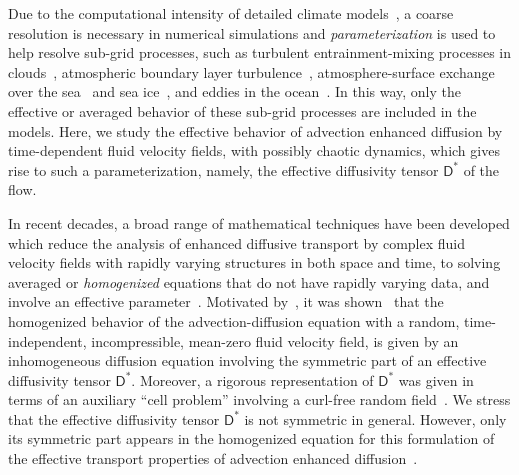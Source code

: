 \documentclass[leqno,onefignum,onetabnum]{siamltex1213}
\newcommand{\Dm}{\mathsf{D}}
\begin{document}
Due to the computational intensity of detailed climate
models~\cite{Griffies:2003:10.1007,Washington:1986:9780935702521,Neelin:2010:CCCM},
a coarse resolution is necessary in numerical simulations and
\emph{parameterization} is used to help resolve sub-grid
processes, such as turbulent 
entrainment-mixing processes in clouds~\cite{Lu:JGR:D50094},
atmospheric boundary layer turbulence~\cite{Bretherton:JOC:5655449},
atmosphere-surface exchange over the
sea~\cite{Fairall:1996:JGRC6562} and sea
ice~\cite{Sorensen:TC:2014,Andreas:2010:QJ618,Andreas:JH:2010,Vihma:2014:9923},
and eddies in the ocean~\cite{McDougall:2001:book,Gent:JPO:1995}. In
this way, only the effective or averaged behavior of these sub-grid
processes are included in the models. Here, we study the effective
behavior of advection enhanced diffusion by time-dependent fluid
velocity fields, with possibly chaotic dynamics, which gives rise to
such a parameterization, namely, the effective diffusivity tensor
$\Dm^*$ of the flow. 



In recent decades, a broad range of mathematical techniques have been
developed
%
%
which reduce the analysis of enhanced diffusive transport by complex
fluid velocity fields with rapidly varying structures in both space
and time, to 
solving averaged or \emph{homogenized} equations that do not have
rapidly varying data, and involve an effective
parameter~\cite{Papanicolaou:1981:36:8,McLaughlin:SIAM_JAM:780,Bensoussan:Book:1978,Biferale:PF:2725,Fannjiang:SIAM_JAM:333,Fannjiang:1997:1033,Mauri:1991:3:743,Pavliotis:PHD_Thesis,Pavliotis:CMS:2007:507,Clark:1998:364,Holmes:1995:94481954,Hornung:1997:9780387947860,Majda:Kramer:1999:book,Majda:1994:10.1088}. Motivated
by~\cite{Papanicolaou:RF-835}, it was
shown~\cite{McLaughlin:SIAM_JAM:780} that the homogenized behavior of
the advection-diffusion equation with a random, time-independent,
incompressible, mean-zero fluid velocity field, is given by an
inhomogeneous diffusion equation involving the symmetric part of an
effective diffusivity tensor $\Dm^*$. Moreover, a rigorous
representation of $\Dm^*$ was given in terms of an auxiliary ``cell
problem'' involving a curl-free random
field~\cite{McLaughlin:SIAM_JAM:780}. We stress that the effective
diffusivity tensor $\Dm^*$ is not symmetric in general. However, only
its symmetric part appears in the homogenized equation for this
formulation of the effective transport properties of advection
enhanced diffusion~\cite{McLaughlin:SIAM_JAM:780}.    
\end{document}
